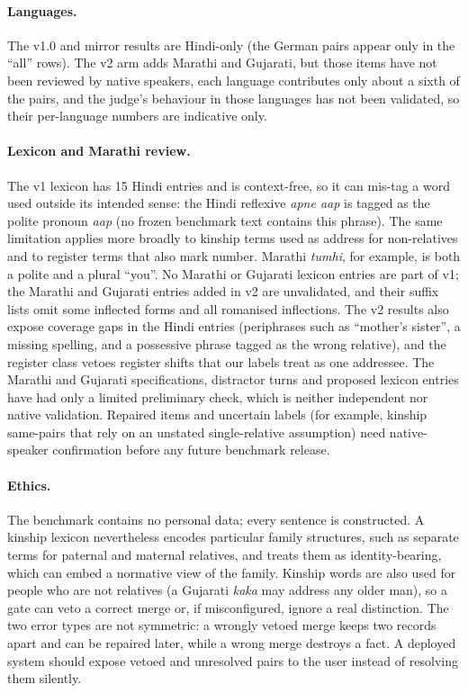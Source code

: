 \paragraph{Languages.} The v1.0 and mirror results are Hindi-only (the German pairs appear only in the ``all'' rows). The v2 arm adds
Marathi and Gujarati, but those items have not been reviewed by native speakers, each language contributes only about a sixth of the
pairs, and the judge's behaviour in those languages has not been validated, so their per-language numbers are indicative only.

\paragraph{Lexicon and Marathi review.} The v1 lexicon has 15 Hindi entries and is context-free, so it can mis-tag a word used outside its intended sense:
the Hindi reflexive \emph{apne aap} is tagged as the polite pronoun \emph{aap} (no frozen benchmark text contains this phrase). The same limitation applies more broadly
to kinship terms used as address for non-relatives and to register terms that also mark number. Marathi \emph{tumhi}, for example, is both a polite and a plural ``you''.
No Marathi or Gujarati lexicon entries are part of v1; the Marathi and Gujarati entries added in v2 are unvalidated, and their suffix lists omit some inflected forms and all romanised inflections.
The v2 results also expose coverage gaps in the Hindi entries (periphrases such as ``mother's sister'', a missing spelling, and a possessive phrase tagged as the wrong relative), and the register class
vetoes register shifts that our labels treat as one addressee. The Marathi and Gujarati specifications, distractor turns and proposed lexicon entries
have had only a limited preliminary check, which is neither independent nor native validation.
Repaired items and uncertain labels (for example, kinship same-pairs that rely on an unstated single-relative assumption) need native-speaker confirmation before any future benchmark release.

\paragraph{Ethics.} The benchmark contains no personal data; every sentence is constructed. A kinship lexicon nevertheless encodes particular
family structures, such as separate terms for paternal and maternal relatives, and treats them as identity-bearing, which can embed a normative
view of the family. Kinship words are also used for people who are not relatives (a Gujarati \emph{kaka} may address any older man), so a gate
can veto a correct merge or, if misconfigured, ignore a real distinction. The two error types are not symmetric: a wrongly vetoed merge keeps
two records apart and can be repaired later, while a wrong merge destroys a fact. A deployed system should expose vetoed and unresolved pairs
to the user instead of resolving them silently.
